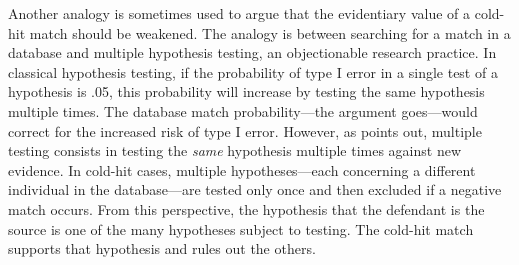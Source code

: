 \documentclass{article}
\begin{document}
Another analogy is sometimes used to argue that the evidentiary value of a cold-hit match should be weakened. The analogy is between searching for a match in a database and multiple hypothesis testing, an objectionable  research practice. In  classical hypothesis testing, if the probability of type I error in a single test of a hypothesis is .05, this probability will increase by testing the same hypothesis multiple times. The database match probability---the argument goes---would correct for the increased risk of type I error. %
However, as \citet{balding2002DNDatabaseSearch,Balding2005Weight}  points out, multiple testing consists in testing the \textit{same} hypothesis  multiple times against new evidence. In cold-hit cases, 
multiple hypotheses---each concerning a different individual in the database---are tested only once and then excluded if a negative match occurs. 
From this perspective, the hypothesis that the defendant is the source is one of the many hypotheses subject to testing. The cold-hit match supports that hypothesis and rules out the others. 

%
\end{document}
